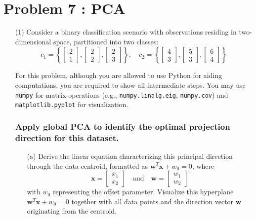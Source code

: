 \documentclass[11pt,addpoints,answers]{exam}
\begin{document}
	\section*{Problem 7 : PCA}
	
	\begin{enumerate}
		\item[(1)] Consider a binary classification scenario with observations residing in two-dimensional space, partitioned into two classes:  
		\[
		c_{1}=\left\{ \begin{bmatrix} 2 \\ 1 \end{bmatrix}, \begin{bmatrix} 2 \\ 2 \end{bmatrix}, \begin{bmatrix} 2 \\ 3 \end{bmatrix} \right\}, \quad c_{2}=\left\{ \begin{bmatrix} 4 \\ 3 \end{bmatrix}, \begin{bmatrix} 5 \\ 3 \end{bmatrix}, \begin{bmatrix} 6 \\ 4 \end{bmatrix} \right\}
		\]
		
		For this problem, although you are allowed to use Python for aiding computations, you are required to show all intermediate steps. You may use \texttt{numpy} for matrix operations (e.g., \texttt{numpy.linalg.eig}, \texttt{numpy.cov}) and \texttt{matplotlib.pyplot} for visualization.
		
		
		\subsubsection*{Apply global PCA to identify the optimal projection direction for this dataset.}
		\begin{enumerate}
			\item[(a)] Derive the linear equation characterizing this principal direction through the data centroid, formatted as $\mathbf{w}^{T} \mathbf{x} + w_{0} = 0$, where 
			\[
			\mathbf{x} = \begin{bmatrix} x_{1} \\ x_{2} \end{bmatrix} \quad \text{and} \quad \mathbf{w} = \begin{bmatrix} w_{1} \\ w_{2} \end{bmatrix}
			\]
			with $w_{0}$ representing the offset parameter. Visualize this hyperplane $\mathbf{w}^{T} \mathbf{x} + w_{0} = 0$ together with all data points and the direction vector $\mathbf{w}$ originating from the centroid.
			

\end{enumerate}
\end{enumerate}
\end{document}
